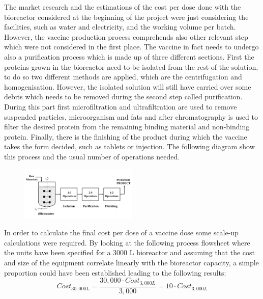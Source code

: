 The market research and the estimations of the cost per dose done with the bioreactor considered at the beginning of the project were just considering the facilities, such as water and electricity, and the working volume per batch. However, the vaccine production process comprehends also other relevant step which were not considered in the first place. The vaccine in fact needs to undergo also a  purification process which is made up of three different sections. First the proteins grown in the bioreactor need to be isolated from the rest of the solution, to do so two different methods are applied, which are the centrifugation and homogenisation. However, the isolated solution will still have carried over some debris which needs to be removed during the second step called purification. During this part first microfiltration and ultrafiltration are used to remove suspended particles, microorganism and fats and after chromatography is used to filter the desired protein from the remaining binding material and non-binding protein. Finally, there is the finishing of the product during which the vaccine takes the form decided, such as tablets or injection. The following diagram show this process and the usual number of operations needed.
\begin{figure}
    \centering
    \includegraphics[width=0.5\textwidth]{design-process.jpeg}
\end{figure}

In order to calculate the final cost per dose of a vaccine dose some scale-up calculations were required. By looking at the following process flowsheet where the units have been specified for a 3000 L bioreactor and assuming that the cost and size of the equipment correlate linearly with the bioreactor capacity, a simple proportion could have been established leading to the following results:
\begin{equation}
    Cost_{30,000L} = \frac{30,000 \cdot Cost_{3,000L}}{3,000} = 10 \cdot Cost_{3,000L}
\end{equation}


